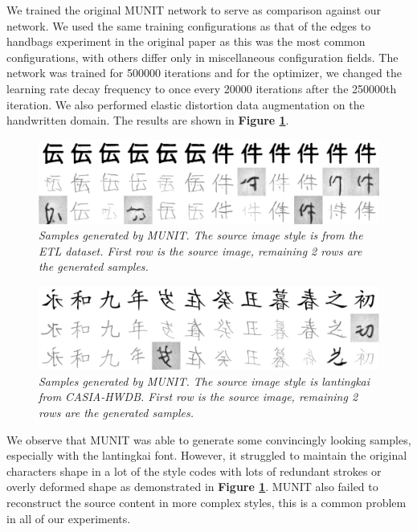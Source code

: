 \documentclass[12pt]{report}
\begin{document}
We trained the original MUNIT\cite{munit} network to serve as comparison against our network. We used the same training configurations as that of the edges to handbags experiment in the original paper as this was the most common configurations, with others differ only in miscellaneous configuration fields. The network was trained for 500000 iterations and for the optimizer, we changed the learning rate decay frequency to once every 20000 iterations after the 250000th iteration. We also performed elastic distortion data augmentation on the handwritten domain. The results are shown in \textbf{Figure \ref{fig:munit-results}}.

\begin{figure}[H]
	\centering
	\includegraphics[scale=0.2]{munit-results}
	\caption{\textit{Samples generated by MUNIT\cite{munit}. The source image style is from the ETL dataset. First row is the source image, remaining 2 rows are the generated samples.}}
	\label{fig:munit-results}
\end{figure}

\begin{figure}[H]
	\centering
	\includegraphics[scale=0.2]{munit-results-2}
	\caption{\textit{Samples generated by MUNIT\cite{munit}. The source image style is lantingkai from CASIA-HWDB\cite{casia}. First row is the source image, remaining 2 rows are the generated samples. }}
	\label{fig:munit-results-2}
\end{figure}

We observe that MUNIT was able to generate some convincingly looking samples, especially with the lantingkai font. However, it struggled to maintain the original characters shape in a lot of the style codes with lots of redundant strokes or overly deformed shape as demonstrated in \textbf{Figure \ref{fig:munit-results}}. MUNIT also failed to reconstruct the source content in more complex styles, this is a common problem in all of our experiments.
\end{document}
